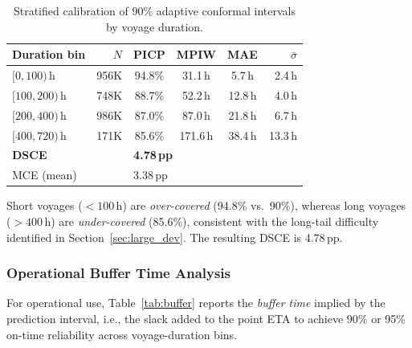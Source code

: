 \documentclass[conference]{IEEEtran}
\begin{document}
\begin{table}[t]
    \centering
    \caption{Stratified calibration of 90\% adaptive conformal intervals by voyage duration.}
    \label{tab:stratified_calib}
    \footnotesize
    \begin{tabular}{lrcccr}
        \toprule
        \textbf{Duration bin} & \textbf{$N$} & \textbf{PICP} & \textbf{MPIW} & \textbf{MAE} & $\bar{\sigma}$ \\
        \midrule
        $[0, 100)$\,h   & 956K  & 94.8\% & 31.1\,h  & 5.7\,h  & 2.4\,h \\
        $[100, 200)$\,h  & 748K  & 88.7\% & 52.2\,h  & 12.8\,h & 4.0\,h \\
        $[200, 400)$\,h  & 986K  & 87.0\% & 87.0\,h  & 21.8\,h & 6.7\,h \\
        $[400, 720)$\,h  & 171K  & 85.6\% & 171.6\,h & 38.4\,h & 13.3\,h \\
        \midrule
        \multicolumn{2}{l}{\textbf{DSCE}} & \multicolumn{4}{l}{\textbf{4.78\,pp}} \\
        \multicolumn{2}{l}{MCE (mean)} & \multicolumn{4}{l}{3.38\,pp} \\
        \bottomrule
    \end{tabular}
\end{table}

\noindent Short voyages ($< 100$\,h) are \textit{over-covered} (94.8\% vs.\ 90\%), whereas long voyages ($> 400$\,h) are \textit{under-covered} (85.6\%), consistent with the long-tail difficulty identified in Section~\ref{sec:large_dev}. The resulting DSCE is 4.78\,pp.

\subsubsection{Operational Buffer Time Analysis}

For operational use, Table~\ref{tab:buffer} reports the \textit{buffer time} implied by the prediction interval, i.e., the slack added to the point ETA to achieve 90\% or 95\% on-time reliability across voyage-duration bins.
\end{document}
